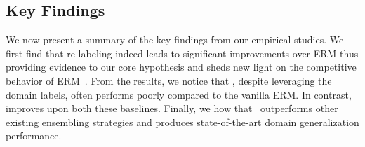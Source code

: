 \subsection{Key Findings}
We now present a summary of the key findings from our empirical studies. We first find that re-labeling indeed leads to significant improvements over ERM thus providing evidence to our core hypothesis and sheds new light on the competitive behavior of ERM~\citep{gulrajani2020search}. From the results, we notice that \gro, despite leveraging the domain labels, often performs poorly compared to the vanilla ERM. In contrast, \regmethod improves upon both these baselines. Finally, we how that \muld~outperforms other existing ensembling strategies and produces state-of-the-art domain generalization performance.
\begin{table*}[h]
\centering
\caption{\textbf{Re-labeling domains improves generalization}. Here, for each dataset, we show the detailed generalization results for each of the domains using models trained with the remaining three domains. Both \muld~and \regmethod, which re-label samples from the different source domains and perform multi-domain training, lead to significant performance gains over ERM as well as the standard GroupDRO implementation.}
\label{tab:groupdro}
\renewcommand{\arraystretch}{1.2}
\end{table*}
